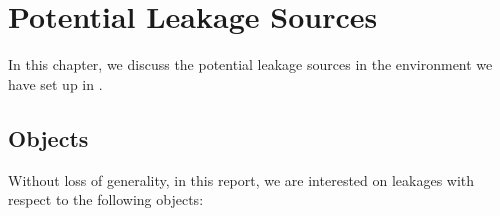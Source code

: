 \chapter{Potential Leakage Sources}

In this chapter, we discuss the potential leakage sources in the environment we have set up in . 


%
%
%

\section{Objects} \label{Sec: Objects}

Without loss of generality, in this report, we are interested on leakages with respect to the following objects:

